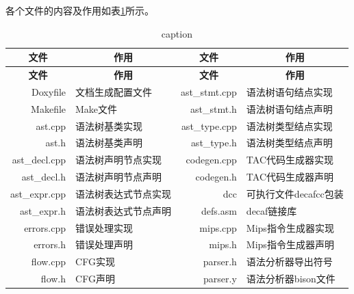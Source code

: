 \documentclass{report}
\begin{document}
\par 各个文件的内容及作用如表\ref{tab:file}所示。
\begin{center}
    \begin{longtable}{r l r l}
        \caption{caption}
        \label{tab:file} \\

        \toprule
        \multicolumn{1}{c}{\textbf{文件}} &
        \multicolumn{1}{c}{\textbf{作用}} &
        \multicolumn{1}{c}{\textbf{文件}} &
        \multicolumn{1}{c}{\textbf{作用}} \\
        \cmidrule(lr){1-1} \cmidrule(lr){2-2}
        \cmidrule(lr){3-3} \cmidrule(lr){4-4}
        \endfirsthead

        \toprule
        \multicolumn{1}{c}{\textbf{文件}} &
        \multicolumn{1}{c}{\textbf{作用}} &
        \multicolumn{1}{c}{\textbf{文件}} &
        \multicolumn{1}{c}{\textbf{作用}} \\
        \cmidrule(lr){1-1} \cmidrule(lr){2-2}
        \cmidrule(lr){3-3} \cmidrule(lr){4-4}
        \endhead
        Doxyfile       & 文档生成配置文件       & ast\_stmt.cpp & 语法树语句结点实现\\
        Makefile       & Make文件               & ast\_stmt.h   & 语法树语句结点声明\\
        ast.cpp        & 语法树基类实现         & ast\_type.cpp & 语法树类型结点实现\\
        ast.h          & 语法树基类声明         & ast\_type.h   & 语法树类型结点声明\\
        ast\_decl.cpp  & 语法树声明节点实现     & codegen.cpp   & TAC代码生成器实现\\
        ast\_decl.h    & 语法树声明节点声明     & codegen.h     & TAC代码生成器声明\\
        ast\_expr.cpp  & 语法树表达式节点实现   & dcc           & 可执行文件decafcc包装\\
        ast\_expr.h    & 语法树表达式节点声明   & defs.asm      & decaf链接库\\
        errors.cpp     & 错误处理实现           & mips.cpp      & Mips指令生成器实现\\
        errors.h       & 错误处理声明           & mips.h        & Mips指令生成器声明\\
        flow.cpp       & CFG实现                & parser.h      & 语法分析器导出符号\\
        flow.h         & CFG声明                & parser.y      & 语法分析器bison文件\\

\end{longtable}
\end{center}
\end{document}
